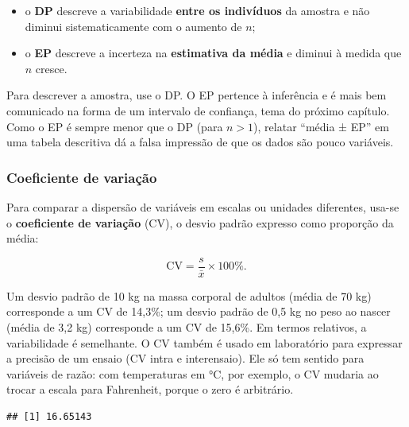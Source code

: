 \documentclass[
]{book}
\newenvironment{Shaded}{\begin{snugshade}}{\end{snugshade}}
\newcommand{\ControlFlowTok}[1]{\textcolor[rgb]{0.13,0.29,0.53}{\textbf{#1}}}
\newcommand{\DecValTok}[1]{\textcolor[rgb]{0.00,0.00,0.81}{#1}}
\newcommand{\FunctionTok}[1]{\textcolor[rgb]{0.13,0.29,0.53}{\textbf{#1}}}
\newcommand{\NormalTok}[1]{#1}
\newcommand{\OtherTok}[1]{\textcolor[rgb]{0.56,0.35,0.01}{#1}}
\newcommand{\SpecialCharTok}[1]{\textcolor[rgb]{0.81,0.36,0.00}{\textbf{#1}}}
\providecommand{\tightlist}{%
  \setlength{\itemsep}{0pt}\setlength{\parskip}{0pt}}
\begin{document}
\begin{itemize}
\tightlist
\item
  o \textbf{DP} descreve a variabilidade \textbf{entre os indivíduos} da amostra e não diminui sistematicamente com o aumento de \(n\);
\item
  o \textbf{EP} descreve a incerteza na \textbf{estimativa da média} e diminui à medida que \(n\) cresce.
\end{itemize}

Para descrever a amostra, use o DP. O EP pertence à inferência e é mais bem comunicado na forma de um intervalo de confiança, tema do próximo capítulo. Como o EP é sempre menor que o DP (para \(n > 1\)), relatar ``média ± EP'' em uma tabela descritiva dá a falsa impressão de que os dados são pouco variáveis.

\subsubsection{Coeficiente de variação}\label{coeficiente-de-variauxe7uxe3o}

Para comparar a dispersão de variáveis em escalas ou unidades diferentes, usa-se o \textbf{coeficiente de variação} (CV), o desvio padrão expresso como proporção da média:

\[
\text{CV} = \frac{s}{\bar{x}} \times 100\%.
\]

Um desvio padrão de 10 kg na massa corporal de adultos (média de 70 kg) corresponde a um CV de 14,3\%; um desvio padrão de 0,5 kg no peso ao nascer (média de 3,2 kg) corresponde a um CV de 15,6\%. Em termos relativos, a variabilidade é semelhante. O CV também é usado em laboratório para expressar a precisão de um ensaio (CV intra e interensaio). Ele só tem sentido para variáveis de razão: com temperaturas em °C, por exemplo, o CV mudaria ao trocar a escala para Fahrenheit, porque o zero é arbitrário.

\begin{Shaded}
\end{Shaded}

\begin{verbatim}
## [1] 16.65143
\end{verbatim}
\end{document}
